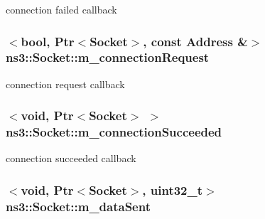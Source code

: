 connection failed callback 

\subsubsection[{\texorpdfstring{m\+\_\+connection\+Request}{m_connectionRequest}}]{$<$bool, {\bf Ptr}$<${\bf Socket}$>$, const {\bf Address} \&$>$ ns3\+::\+Socket\+::m\+\_\+connection\+Request\hspace{0.3cm}{\ttfamily [private]}}\hypertarget{classns3_1_1Socket_afaf3b168b6508bbfd6812c277fe8adcf}{}\label{classns3_1_1Socket_afaf3b168b6508bbfd6812c277fe8adcf}


connection request callback 

\subsubsection[{\texorpdfstring{m\+\_\+connection\+Succeeded}{m_connectionSucceeded}}]{$<$void, {\bf Ptr}$<${\bf Socket}$>$ $>$ ns3\+::\+Socket\+::m\+\_\+connection\+Succeeded\hspace{0.3cm}{\ttfamily [private]}}\hypertarget{classns3_1_1Socket_a77a74e2e90422f1685ca881513045412}{}\label{classns3_1_1Socket_a77a74e2e90422f1685ca881513045412}


connection succeeded callback 

\subsubsection[{\texorpdfstring{m\+\_\+data\+Sent}{m_dataSent}}]{$<$void, {\bf Ptr}$<${\bf Socket}$>$, uint32\+\_\+t$>$ ns3\+::\+Socket\+::m\+\_\+data\+Sent\hspace{0.3cm}{\ttfamily [private]}}\hypertarget{classns3_1_1Socket_ad55ae6865f79d151176e1014c6ac5b0e}{}\label{classns3_1_1Socket_ad55ae6865f79d151176e1014c6ac5b0e}


